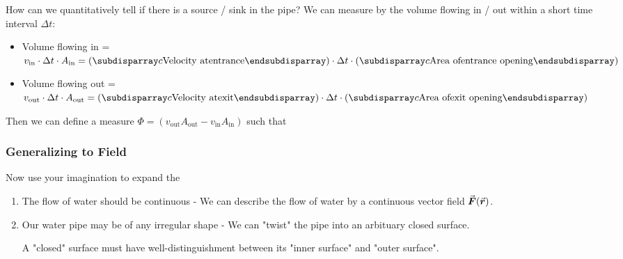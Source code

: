 \documentclass[class=article, crop=false, 12pt]{standalone}
\begin{document}
How can we quantitatively tell if there is a source / sink in the pipe?
We can measure by the volume flowing in / out within a short time interval $\Delta t$:
\begin{itemize}
    \item Volume flowing in = $v_\text{in}\cdot \Delta t \cdot A_\text{in} 
    = \qty(\mstack{\text{Velocity at}\\\text{entrance}})\cdot \Delta t \cdot \qty(\mstack{\text{Area of}\\\text{entrance opening}})$

    \item Volume flowing out = $v_\text{out}\cdot \Delta t \cdot A_\text{out}
     = \qty(\mstack{\text{Velocity at}\\\text{exit}})\cdot \Delta t \cdot \qty(\mstack{\text{Area of}\\\text{exit opening}})$
\end{itemize}

Then we can define a measure $\Phi = (v_\text{out}A_\text{out} - v_\text{in}A_\text{in})$
such that

\subsubsection{Generalizing to Field}

Now use your imagination to expand the 

\begin{enumerate}
    \item The flow of water should be continuous - 
    We can describe the flow of water by a continuous vector field $\va*{F}(\va*{r})$.
    

    \item Our water pipe may be of any irregular shape - 
    We can "twist" the pipe into an arbituary closed surface.


    A "closed" surface must have well-distinguishment between its
    "inner surface" and "outer surface".

\end{enumerate}
\end{document}
